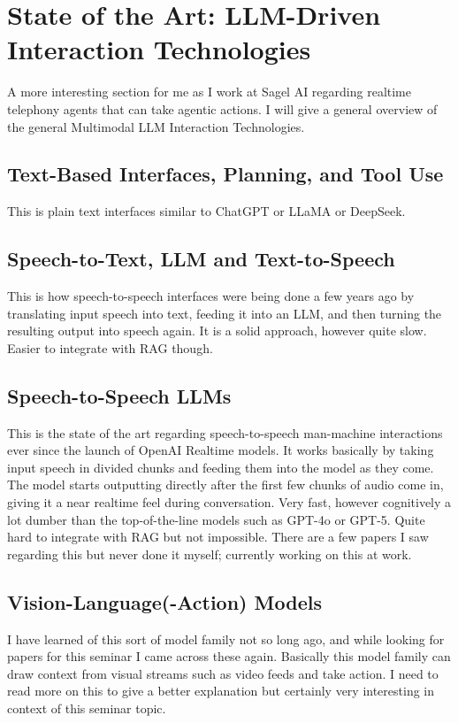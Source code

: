 \section{State of the Art: LLM-Driven Interaction Technologies}
\label{sec:llmtech}

A more interesting section for me as I work at Sagel AI regarding realtime telephony agents that can take agentic actions.
I will give a general overview of the general Multimodal LLM Interaction Technologies.

\subsection{Text-Based Interfaces, Planning, and Tool Use}
This is plain text interfaces similar to ChatGPT or LLaMA or DeepSeek.

\subsection{Speech-to-Text, LLM and Text-to-Speech}
This is how speech-to-speech interfaces were being done a few years ago by translating input speech into text, feeding it into an LLM, and then turning the resulting output into speech again.
It is a solid approach, however quite slow. Easier to integrate with RAG though.

\subsection{Speech-to-Speech LLMs}
This is the state of the art regarding speech-to-speech man-machine interactions ever since the launch of OpenAI Realtime models.
It works basically by taking input speech in divided chunks and feeding them into the model as they come.
The model starts outputting directly after the first few chunks of audio come in, giving it a near realtime feel during conversation.
Very fast, however cognitively a lot dumber than the top-of-the-line models such as GPT-4o or GPT-5.
Quite hard to integrate with RAG but not impossible. There are a few papers I saw regarding this but never done it myself; currently working on this at work.

\subsection{Vision-Language(-Action) Models}
I have learned of this sort of model family not so long ago, and while looking for papers for this seminar I came across these again.
Basically this model family can draw context from visual streams such as video feeds and take action.
I need to read more on this to give a better explanation but certainly very interesting in context of this seminar topic.

